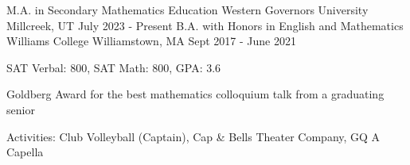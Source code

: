\begin{cventries}
  \cventry
  {M.A. in Secondary Mathematics Education}
  {Western Governors University}
  {Millcreek, UT}
  {July 2023 - Present}
  {}
  \cventry
  {B.A. with Honors in English and Mathematics}
  {Williams College}
  {Williamstown, MA}
  {Sept 2017 - June 2021}
  {
    \begin{cvitems}
      \item {SAT Verbal: 800, SAT Math: 800, GPA: 3.6}
      \item {Goldberg Award for the best mathematics colloquium talk from a graduating senior}
      \item {Activities: Club Volleyball (Captain), Cap \& Bells Theater Company, GQ A Capella}
    \end{cvitems}
  }
\end{cventries}
